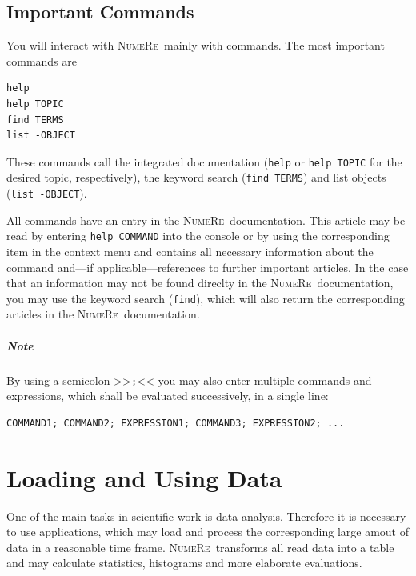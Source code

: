 \documentclass[DIV=14,headsepline,footsepline]{scrbook}
\newcommand{\NR}{\textsc{Nu\-me\-Re}}
\begin{document}
			\section{Important Commands}
				You will interact with \NR\ mainly with commands. The most important commands are
					\begin{lstlisting}
help
help TOPIC
find TERMS
list -OBJECT
					\end{lstlisting}
					These commands call the integrated documentation (\verb+help+ or \verb+help TOPIC+ for the desired topic, respectively), the keyword search (\verb+find TERMS+) and list objects (\verb+list -OBJECT+).
					
					All commands have an entry in the \NR\ documentation. This article may be read by entering \verb+help COMMAND+ into the console or by using the corresponding item in the context menu and contains all necessary information about the command and---if applicable---references to further important articles. In the case that an information may not be found direclty in the \NR\ documentation, you may use the keyword search (\verb+find+), which will also return the corresponding articles in the \NR\ documentation.
					\paragraph{Note}
						By using a semicolon >>\verb+;+<< you may also enter multiple commands and expressions, which shall be evaluated successively, in a single line:
						\begin{lstlisting}
COMMAND1; COMMAND2; EXPRESSION1; COMMAND3; EXPRESSION2; ...
						\end{lstlisting}
		\chapter{Loading and Using Data}
			One of the main tasks in scientific work is data analysis. Therefore it is necessary to use applications, which may load and process the corresponding large amout of data in a reasonable time frame. \NR\ transforms all read data into a table and may calculate statistics, histograms and more elaborate evaluations.
\end{document}
